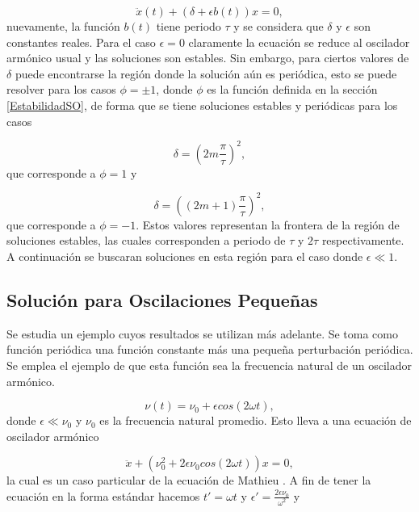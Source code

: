 \documentclass[10pt,a4paper]{report}
\begin{document}
\begin{equation}
\ddot{x}(t) + (\delta + \epsilon b(t))x = 0,
\end{equation} nuevamente, la función $b(t)$ tiene periodo $\tau$ y se considera que $\delta$ y $\epsilon$ son constantes reales. Para el caso $\epsilon = 0$ claramente la ecuación se reduce al oscilador armónico usual y las soluciones son estables. Sin embargo, para ciertos valores de $\delta$ puede encontrarse la región donde la solución aún es periódica, esto se puede resolver para los casos $\phi = \pm 1$, donde $\phi$ es la función definida en la sección \eqref{EstabilidadSO}, de forma que se tiene soluciones estables y periódicas para los casos

\begin{equation}
\delta = (2m\frac{\pi}{\tau})^2, 
\end{equation} que corresponde a $\phi=1$ y

\begin{equation}
\delta = ((2m+1)\frac{\pi}{\tau})^2,
\end{equation}
que corresponde a $\phi=-1$. Estos valores representan la frontera de
la región de soluciones estables, las cuales corresponden a periodo de
$\tau$ y $2\tau$ respectivamente. A continuación se buscaran soluciones
en esta región para el caso donde $\epsilon \ll 1$.

\subsection{Solución para Oscilaciones Pequeñas}

Se estudia un ejemplo cuyos resultados se utilizan más adelante. Se toma como función periódica una función constante más una pequeña perturbación periódica. Se emplea el ejemplo de que esta función sea la frecuencia natural de un oscilador armónico.

\begin{equation}\label{SmallOscillationsTDHO}
\nu(t) = \nu_0 + \epsilon cos(2\omega t),
\end{equation} donde $\epsilon \ll \nu_0$ y $\nu_0$ es la frecuencia natural promedio. Esto lleva a una ecuación de oscilador armónico

\begin{equation}
\ddot{x} + (\nu_0^2 + 2\epsilon \nu_0 cos(2\omega t))x = 0,
\end{equation} la cual es un caso particular de la ecuación de Mathieu \cite{PiatekME}. A fin de tener la ecuación en la forma estándar hacemos $t'= \omega t$ y $\epsilon' = \frac{2\epsilon \nu_0}{\omega^2}$ y
\end{document}

